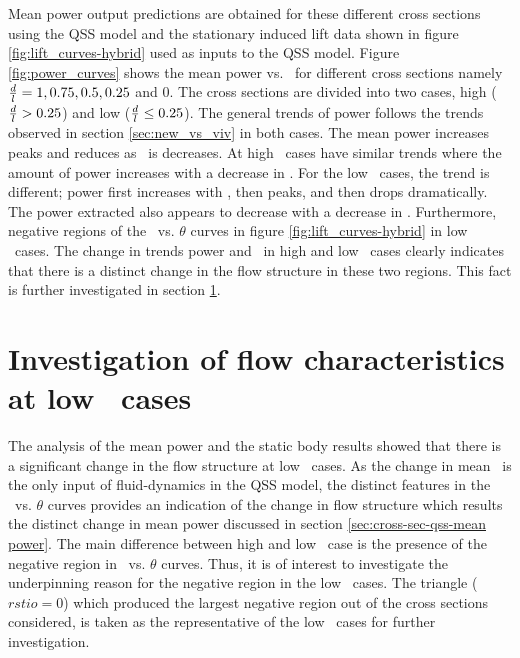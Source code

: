  Mean power output predictions are obtained for these different cross sections using the QSS model and the stationary induced lift data shown in figure \ref{fig:lift_curves-hybrid} used as inputs to the QSS model. Figure \ref{fig:power_curves} shows the mean power vs. \massdamp\ for different cross sections namely $\frac{d}{l}=1,0.75,0.5,0.25$ and $0$. The cross sections are divided into two cases, high ($\frac{d}{l} > 0.25$) and low ($\frac{d}{l} \leq 0.25$). The general trends of power follows the trends observed in section \ref{sec:new_vs_viv} in both cases. The mean power increases peaks and reduces as \massdamp\ is decreases. At high \ratio\ cases have similar trends where the amount of power increases with a decrease in \ratio. For the low \ratio\ cases, the trend is different; power first increases with \massdamp, then peaks, and then drops dramatically. The power extracted also appears to decrease with a decrease in \ratio. Furthermore, negative regions of the \cy\ vs. $\theta$ curves in figure \ref{fig:lift_curves-hybrid} in low \ratio\ cases. The change in trends power and \cy\ in high and low \ratio\ cases clearly indicates that there is a distinct change in the flow structure in these two regions. This fact is further investigated in section \ref{sec:negative-region}.
 


\section{Investigation of flow characteristics at low \ratio\ cases}
 \label{sec:negative-region}

The analysis of the mean power and the static body results showed that there is a significant change in the flow structure at low \ratio\ cases. As the change in mean \cy\ is the only input of fluid-dynamics in the QSS model, the distinct features in the \cy\ vs. $\theta$ curves provides an indication of the change in flow structure which results the distinct change in mean power discussed in section \ref{sec:cross-sec-qss-mean power}. The main difference between high and low \ratio\ case is the presence of the negative region in \cy\ vs. $\theta$ curves. Thus, it is of interest to investigate the underpinning reason for the negative region in the low \ratio\ cases. The triangle ($rstio=0$) which produced the largest negative region out of the cross sections considered, is taken as the representative of the low \ratio\ cases for further investigation. 



